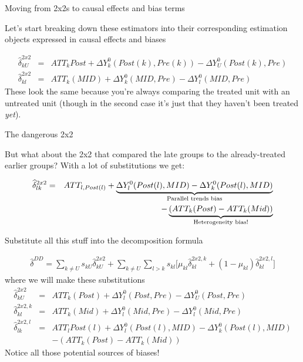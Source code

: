 \documentclass{beamer}
\begin{document}

\begin{frame}{Moving from 2x2s to causal effects and bias terms}

Let's start breaking down these estimators into their corresponding estimation objects expressed in causal effects and biases


\begin{eqnarray*}
\widehat{\delta}^{2x2}_{kU} &=& ATT_k{Post} + \Delta Y^0_k(Post(k),Pre(k)) - \Delta Y^0_U(Post(k),Pre) \\
\widehat{\delta}^{2x2}_{kl} &=& ATT_k(MID) + \Delta Y^0_k(MID,Pre) - \Delta Y^0_l(MID, Pre)
\end{eqnarray*}These look the same because you're always comparing the treated unit with an untreated unit (though in the second case it's just that they haven't been treated \emph{yet}). 

\end{frame}

\begin{frame}{The dangerous 2x2}

But what about the 2x2 that compared the late groups to the already-treated earlier groups? With a lot of substitutions we get:

\begin{eqnarray*}
\widehat{\delta}^{2x2}_{lk} &=& ATT_{l,Post(l)} + \underbrace{\Delta Y^0_l(Post(l),MID) - \Delta Y^0_k ( Post(l), MID)}_{\mathclap{\text{Parallel trends bias}}} \\
&& - \underbrace{(ATT_k(Post) - ATT_k(Mid))}_{\mathclap{\text{Heterogeneity bias!}}}
\end{eqnarray*}


\end{frame}

\begin{frame}{Substitute all this stuff into the decomposition formula}

\begin{eqnarray*}	
\widehat{\delta}^{DD} = \sum_{k \neq U} s_{kU}\widehat{\delta}_{kU}^{2x2} + \sum_{k \neq U} \sum_{l>k} s_{kl}  \bigg [ \mu_{kl}\widehat{\delta}_{kl}^{2x2,k} + (1-\mu_{kl}) \widehat{\delta}_{kl}^{2x2,l} \bigg]
\end{eqnarray*}where we will make these substitutions\begin{eqnarray*}
\widehat{\delta}_{kU}^{2x2} &=& ATT_k(Post) + \Delta Y_l^0(Post,Pre) - \Delta Y_U^0(Post, Pre) \\
\widehat{\delta}_{kl}^{2x2,k} &=& ATT_k(Mid) + \Delta Y_l^0(Mid,Pre) - \Delta Y_l^0(Mid, Pre) \\
\widehat{\delta}^{2x2,l}_{lk} &=& ATT_{l}Post(l) + \Delta Y^0_l(Post(l),MID) - \Delta Y^0_k ( Post(l), MID) \\
&&- (ATT_k(Post) - ATT_k(Mid))
\end{eqnarray*}Notice all those potential sources of biases! 

\end{frame}
\end{document}
